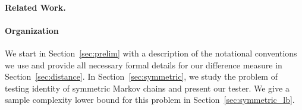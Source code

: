 



\paragraph{Related Work.}
\label{sec:related}


\paragraph{Organization}
We start in Section~\ref{sec:prelim} with a description of the notational conventions we use and provide all necessary formal details for our difference measure in Section~\ref{sec:distance}. 
In Section~\ref{sec:symmetric}, we study the problem of testing identity of symmetric Markov chains and present our tester. We give a sample complexity lower bound for this problem in Section~\ref{sec:symmetric_lb}. 

